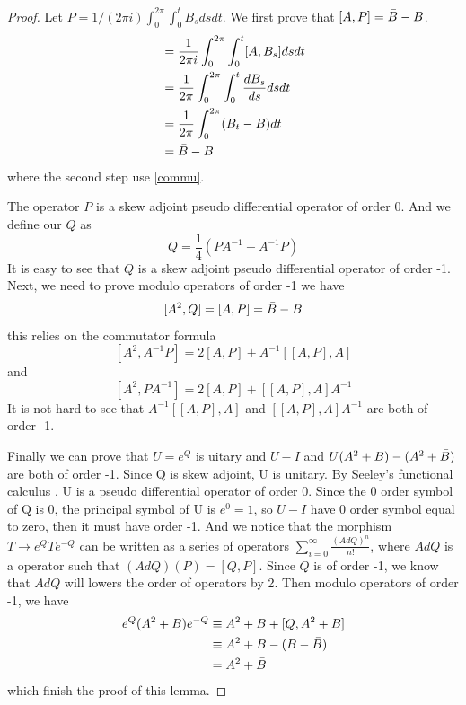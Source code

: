 \documentclass[10pt]{amsart}
\newcommand{\1}{\mathbb{1}}
\begin{document}
\begin{proof}
    Let $P = 1/(2\pi i)\int_0^{2\pi}\int_0^t B_s dsdt$. We first prove that $[A,P] = \Bar{B} - B$.
    \begin{align*}
        [A,P]& = \frac{1}{2\pi i }\int_0^{2\pi}\int_0^t[A, B_s] dsdt\\
             & = \frac{1}{2\pi} \int_0^{2\pi}\int_0^t\frac{dB_s}{ds} dsdt\\
             & = \frac{1}{2\pi} \int_0^{2\pi}(B_t - B) dt\\
             & = \Bar{B} - B
    \end{align*}
    where the second step use \eqref{commu}.

    The operator $P$ is a skew adjoint pseudo differential operator of order 0. And we define our $Q$ as
    \[
    Q = \frac{1}{4}(PA^{-1} + A^{-1}P)
    \]
    It is easy to see that $Q$ is a skew adjoint pseudo differential operator of order -1. Next, we need to prove modulo operators of order -1 we have 
    \[
    [A^2,Q] = [A,P] = \Bar{B} - B
    \]
    this relies on the commutator formula 
    \[
    [A^2,A^{-1}P] = 2[A,P] + A^{-1}[[A,P],A]
    \]
    and
    \[
    [A^2,PA^{-1}] = 2[A,P] + [[A,P],A]A^{-1}
    \]
    It is not hard to see that $A^{-1}[[A,P],A]$ and $[[A,P],A]A^{-1}$ are both of order -1.

    Finally we can prove that $U = e^Q$ is uitary and $U -I$ and $U(A^2 +B ) - (A^2 + \Bar{B})$ are both of order -1. Since Q is skew adjoint, U is unitary. By Seeley's functional calculus \cite{Seeley1967ComplexPO}, U is a pseudo differential operator of order 0. Since the 0 order symbol of Q is 0, the principal symbol of U is $e^0 = 1$, so $U -I $ have 0 order symbol equal to zero, then it must have order -1. And we notice that the morphism $T \rightarrow e^QTe^{-Q}$ can be written as a series of operators $\sum_{i=0}^{\infty} \frac{(Ad Q)^n}{n!}$, where $Ad Q$ is a operator such that $(Ad Q)(P) = [Q,P]$. Since $Q $ is of order -1, we know that $Ad Q$ will lowers the order of operators by 2. Then modulo operators of order -1, we have 
    \begin{align*}
        e^Q(A^2+B)e^{-Q} & \equiv A^2 +B + [Q,A^2+B]\\
                         & \equiv A^2 +B -(B - \Bar{B})\\
                         & = A^2 + \Bar{B}
    \end{align*}
    which finish the proof of this lemma.
\end{proof}
\end{document}
